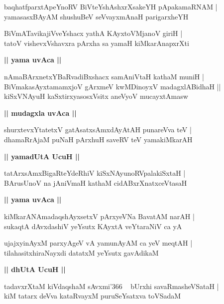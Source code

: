 \documentclass[twoside,12pt,openright]{book}
\newcounter{shloka}[chapter]
\def\uvaca#1{\centerline{{\large\textbf{#1}}}}
\begin{document}
\begin{shloka}%
baqhatfparxtApeYnoRV BiVteYshAshxrXsakeYH pApakamaRNAM |\\
yamasasxBAyAM shushuBeV seVvayxmAnaH parigarxheYH 
\end{shloka}

\begin{shloka}%
BiVmATavikajiVveYshacx yathA KAyxtoVMjanoV giriH |\\
tatoV vishevxVshavxra pArxha sa yamaH kiMkarAnapxrXti
\end{shloka}

\uvaca{|| yama uvAca ||}

\begin{shloka}%
nAmaBArxnetxYBaRvadiBxshacx samAniVtaH kathaM muniH |\\
BiVmakasAyxtamamxjoV gArxmeV kwMDinoyxV madagxlABidhaH ||\\
kiSxVNAyuH kaSxtirxyasosxVsitx aneVyoV mucayxtAmasw
\end{shloka}

\uvaca{|| mudagxla uvAca ||}

\begin{shloka}%
shurxtevxYtatetxV gatAsatxsAmxdAyAtAH punareVva teV |\\
dhamaRrAjaM puNaH pArxhuH saveRV teV yamakiMkarAH 
\end{shloka}

\uvaca{|| yamadUtA UcuH ||}

\begin{shloka}%
tatArxsAmxBigaRteYdeRhiV kiSxNAyunoRVpalakiSxtaH |\\
BArusUnoV na jAniVmaH kathaM cidABxrXnatxceVtasaH 	
\end{shloka}

\uvaca{|| yama uvAca ||}

\begin{shloka}%
kiMkarANAmadaqshAyxsetxV pArxyeVNa BavatAM narAH |\\
sukaqtA dAvxdashiV yeYsutx KAyxtA veYtaraNiV ca yA 
\end{shloka}

\begin{shloka}%
ujajxyinAyxM parxyAgeV vA yamunAyAM ca yeV meqtAH |\\
tilahasitxhiraNayxdi datatxM yeYsutx gavAdikaM 
\end{shloka}

\uvaca{|| dhUtA UcuH ||}

\begin{shloka}%
tadavxrXtaM kiVdaqshaM sAvxmi\char'366 ~ bUrxhi savaRmasheVSataH |\\
kiM tatarx deVva kataRvayxM puruSeYsatxva toVSadaM 
\end{shloka}
\end{document}
